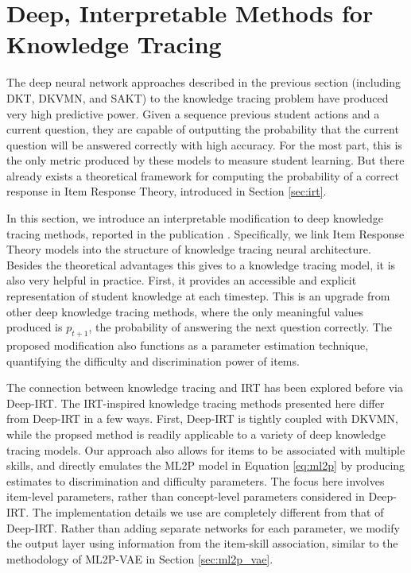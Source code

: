 \chapter{Deep, Interpretable Methods for Knowledge Tracing} \label{ch:kt_methods}

The deep neural network approaches described in the previous section (including DKT, DKVMN, and SAKT) to the knowledge tracing problem have produced very high predictive power. Given a sequence previous student actions and a current question, they are capable of outputting the probability that the current question will be answered correctly with high accuracy. For the most part, this is the only metric produced by these models to measure student learning. But there already exists a theoretical framework for computing the probability of a correct response in Item Response Theory, introduced in Section \ref{sec:irt}.

In this section, we introduce an interpretable modification to deep knowledge tracing methods, reported in the publication \cite{kt_irt}. Specifically, we link Item Response Theory models into the structure of knowledge tracing neural architecture. Besides the theoretical advantages this gives to a knowledge tracing model, it is also very helpful in practice. First, it provides an accessible and explicit representation of student knowledge at each timestep. This is an upgrade from other deep knowledge tracing methods, where the only meaningful values produced is $p_{t+1}$, the probability of answering the next question correctly. The proposed modification also functions as a parameter estimation technique, quantifying the difficulty and discrimination power of items.

The connection between knowledge tracing and IRT has been explored before via Deep-IRT. The IRT-inspired knowledge tracing methods presented here differ from Deep-IRT in a few ways. First, Deep-IRT is tightly coupled with DKVMN, while the propsed method is readily applicable to a variety of deep knowledge tracing models. Our approach also allows for items to be associated with multiple skills, and directly emulates the ML2P model in Equation \ref{eq:ml2p} by producing estimates to discrimination and difficulty parameters. The focus here involves item-level parameters, rather than concept-level parameters considered in Deep-IRT. The implementation details we use are completely different from that of Deep-IRT. Rather than adding separate networks for each parameter, we modify the output layer using information from the item-skill association, similar to the methodology of ML2P-VAE in Section \ref{sec:ml2p_vae}.

